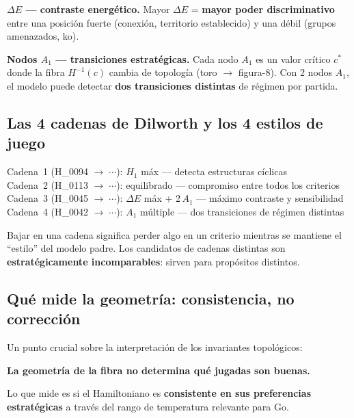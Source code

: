 \documentclass[11pt, a4paper]{article}
\begin{document}
\textbf{$\Delta E$ --- contraste energ\'etico.}
Mayor $\Delta E$ = \textbf{mayor poder discriminativo} entre una posici\'on
fuerte (conexi\'on, territorio establecido) y una d\'ebil (grupos
amenazados, ko).

\textbf{Nodos $A_1$ --- transiciones estrat\'egicas.}
Cada nodo $A_1$ es un valor cr\'itico $c^*$ donde la fibra $H^{-1}(c)$
cambia de topolog\'ia (toro $\to$ figura-8). Con 2 nodos $A_1$, el modelo
puede detectar \textbf{dos transiciones distintas} de r\'egimen por partida.

\subsection{Las 4 cadenas de Dilworth y los 4 estilos de juego}

\begin{tcolorbox}[codebox]
Cadena~1 (H\_0094 $\to\;\cdots$): $H_1$ m\'ax ---
    detecta estructuras c\'iclicas\\
Cadena~2 (H\_0113 $\to\;\cdots$): equilibrado ---
    compromiso entre todos los criterios\\
Cadena~3 (H\_0045 $\to\;\cdots$): $\Delta E$ m\'ax + 2\,$A_1$ ---
    m\'aximo contraste y sensibilidad\\
Cadena~4 (H\_0042 $\to\;\cdots$): $A_1$ m\'ultiple ---
    dos transiciones de r\'egimen distintas
\end{tcolorbox}

Bajar en una cadena significa perder algo en un criterio mientras se
mantiene el ``estilo'' del modelo padre. Los candidatos de cadenas distintas
son \textbf{estrat\'egicamente incomparables}: sirven para prop\'ositos
distintos.

\subsection{Qu\'e mide la geometr\'ia: consistencia, no correcci\'on}

Un punto crucial sobre la interpretaci\'on de los invariantes topol\'ogicos:

\begin{tcolorbox}[theorembox]
  \textbf{La geometr\'ia de la fibra no determina qu\'e jugadas son buenas.}

  \smallskip
  Lo que mide es si el Hamiltoniano es \textbf{consistente en sus preferencias
  estrat\'egicas} a trav\'es del rango de temperatura relevante para Go.
\end{tcolorbox}
\end{document}
